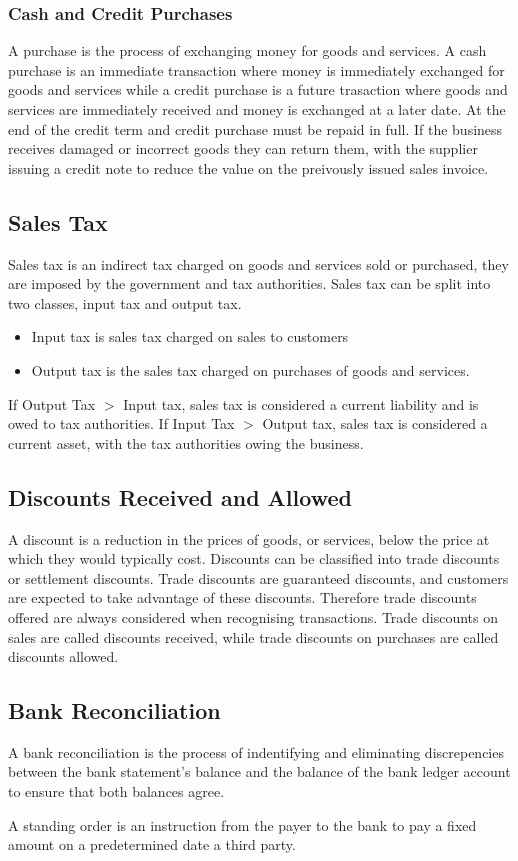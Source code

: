 \subsubsection{Cash and Credit Purchases}

A purchase is the process of exchanging money for goods and services. A cash purchase is an immediate transaction where money is immediately exchanged for goods and services while a credit purchase is a future trasaction where goods and services are immediately received and money is exchanged at a later date. At the end of the credit term and credit purchase must be repaid in full. If the business receives damaged or incorrect goods they
can return them, with the supplier issuing a credit note to reduce the value on the preivously issued sales invoice. 

\subsection{Sales Tax} 

Sales tax is an indirect tax charged on goods and services sold or purchased, they are imposed by the government and tax authorities. Sales tax can be split into two classes, input tax and output tax. 

\begin{itemize}
    \item Input tax is sales tax charged on sales to customers 
    \item Output tax is the sales tax charged on purchases of goods and services.
\end{itemize}

If Output Tax $>$ Input tax, sales tax is considered a current liability and is owed to tax authorities.
If Input Tax $>$ Output tax, sales tax is considered a current asset, with the tax authorities owing the business. 


\subsection{Discounts Received and Allowed}

A discount is a reduction in the prices of goods, or services, below the price at which they would typically cost. Discounts can be classified into trade discounts 
or settlement discounts. Trade discounts are guaranteed discounts, and customers are expected to take advantage of these discounts. Therefore trade discounts offered are always 
considered when recognising transactions. Trade discounts on sales are called discounts received, while trade discounts on purchases are called discounts allowed.

\subsection{Bank Reconciliation}

A bank reconciliation is the process of indentifying and eliminating discrepencies between the bank statement's balance and the balance of the bank ledger account to ensure that both balances agree. 


A standing order is an instruction from the payer to the bank to pay a fixed amount on a predetermined date a third party. 

